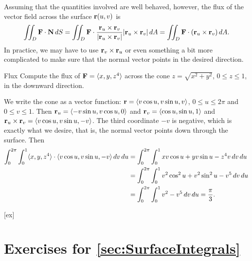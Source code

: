Assuming that the quantities involved are well behaved, however, the
flux of the vector field across the surface ${\bf r}(u,v)$ is
$$\iint_{D} {\bf F}\cdot{\bf N}\,dS
=\iint_{D}{\bf F}\cdot 
 {{\bf r}_u\times{\bf r}_v\over|{\bf r}_u\times{\bf r}_v|}
 |{\bf r}_u\times{\bf r}_v|\,dA
=\iint_{D}{\bf F}\cdot ({\bf r}_u\times{\bf r}_v)\,dA.$$
In practice, we may have to use ${\bf r}_v\times{\bf r}_u$
or even something a bit more complicated to make sure that the normal
vector points in the desired direction.

\begin{example}{Flux}{}
Compute the flux of ${\bf F}=\langle x,y,z^4\rangle$ across the
cone $z=\sqrt{x^2+y^2}$, $0\le z\le 1$, in the downward direction.
\end{example}
\begin{solution}
We write the cone as a vector function: ${\bf r}=\langle v\cos u, v\sin u,
v\rangle$, $0\le u\le 2\pi$ and $0\le v\le 1$.
Then ${\bf r}_u=\langle -v\sin u, v\cos u,0\rangle$ and 
${\bf r}_v=\langle \cos u, \sin u, 1\rangle$ and
${\bf r}_u\times{\bf r}_v=\langle v\cos u,v\sin u,-v\rangle$.
The third coordinate $-v$ is negative, which is exactly what we
desire, that is, the normal vector points down through the
surface. Then 
\begin{align*}
\int_0^{2\pi}\int_0^1 \langle x,y,z^4\rangle\cdot\langle v\cos u,v\sin u,-v\rangle \,dv\,du
&=\int_0^{2\pi}\int_0^1 xv\cos u+yv\sin u-z^4v\,dv\,du	\\
&=\int_0^{2\pi}\int_0^1 v^2\cos^2 u+ v^2\sin^2 u-v^5\,dv\,du	\\
&=\int_0^{2\pi}\int_0^1 v^2-v^5\,dv\,du={\pi\over3}.
\end{align*}
\end{solution}


[ex]
\section*{Exercises for \ref{sec:SurfaceIntegrals}}

